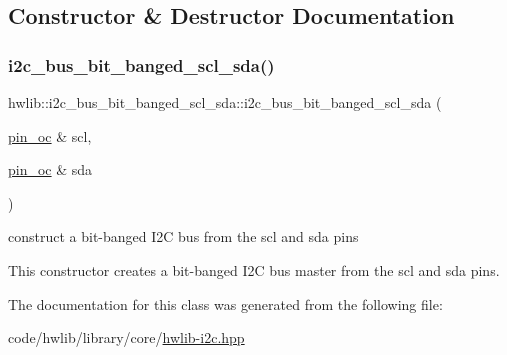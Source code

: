 \subsection{Constructor \& Destructor Documentation}
\mbox{\label{classhwlib_1_1i2c__bus__bit__banged__scl__sda_aff6b11113640da8c8f04b60081bef5ae}} 
\subsubsection{\texorpdfstring{i2c\+\_\+bus\+\_\+bit\+\_\+banged\+\_\+scl\+\_\+sda()}{i2c\_bus\_bit\_banged\_scl\_sda()}}
{\footnotesize\ttfamily hwlib\+::i2c\+\_\+bus\+\_\+bit\+\_\+banged\+\_\+scl\+\_\+sda\+::i2c\+\_\+bus\+\_\+bit\+\_\+banged\+\_\+scl\+\_\+sda (\begin{DoxyParamCaption}\item[{\hyperlink{classhwlib_1_1pin__oc}{pin\+\_\+oc} \&}]{scl,  }\item[{\hyperlink{classhwlib_1_1pin__oc}{pin\+\_\+oc} \&}]{sda }\end{DoxyParamCaption})\hspace{0.3cm}{\ttfamily [inline]}}

construct a bit-\/banged I2C bus from the scl and sda pins

This constructor creates a bit-\/banged I2C bus master from the scl and sda pins. 

The documentation for this class was generated from the following file\+:\begin{DoxyCompactItemize}
\item 
code/hwlib/library/core/\hyperlink{hwlib-i2c_8hpp}{hwlib-\/i2c.\+hpp}\end{DoxyCompactItemize}
